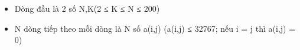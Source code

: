 \begin{itemize}
	\item     Dòng đầu là 2 số N,K(2 ≤ K ≤ N ≤ 200)   
	\item     N dòng tiếp theo mỗi dòng là N số a(i,j) (a(i,j) ≤ 32767; nếu i = j thì a(i,j) = 0)   
\end{itemize}

\